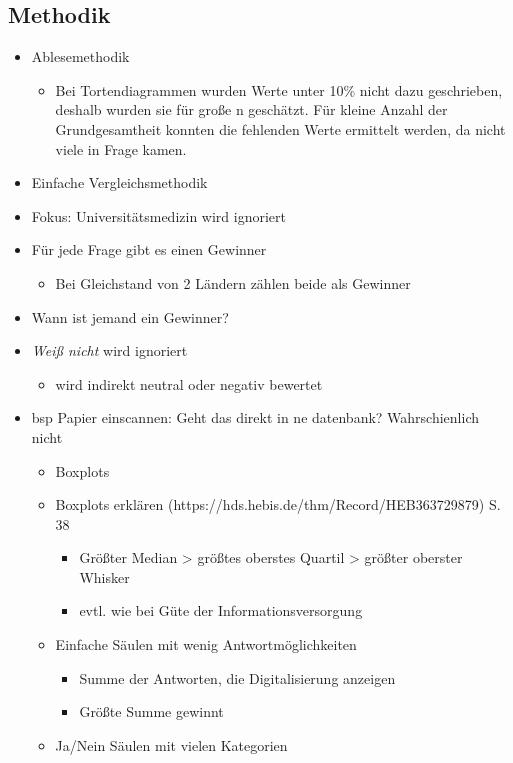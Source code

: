 \subsection{Methodik}
\begin{itemize}
	\item Ablesemethodik
	\begin{itemize}
		\item Bei Tortendiagrammen wurden Werte unter 10\% nicht dazu geschrieben, deshalb wurden sie für große n geschätzt. Für kleine Anzahl der Grundgesamtheit konnten die fehlenden Werte ermittelt werden, da nicht viele in Frage kamen.
	\end{itemize}
	\item Einfache Vergleichsmethodik
	\item Fokus: Universitätsmedizin wird ignoriert
	\item Für jede Frage gibt es einen Gewinner
	\begin{itemize}
		\item Bei Gleichstand von 2 Ländern zählen beide als Gewinner
	\end{itemize}
	\item Wann ist jemand ein Gewinner?
	\item \textit{Weiß nicht} wird ignoriert
	\begin{itemize}
		\item wird indirekt neutral oder negativ bewertet
	\end{itemize}
	\item bsp Papier einscannen: Geht das direkt in ne datenbank? Wahrschienlich nicht
	\begin{itemize}
		\item Boxplots
		\item Boxplots erklären (https://hds.hebis.de/thm/Record/HEB363729879) S. 38
		\begin{itemize}
			\item Größter Median > größtes oberstes Quartil > größter oberster Whisker
			\item evtl. wie bei Güte der Informationsversorgung
		\end{itemize}
		\item Einfache Säulen mit wenig Antwortmöglichkeiten
		\begin{itemize}
			\item Summe der Antworten, die Digitalisierung anzeigen
			\item Größte Summe gewinnt
		\end{itemize}
		\item Ja/Nein Säulen mit vielen Kategorien

\end{itemize}
\end{itemize}
